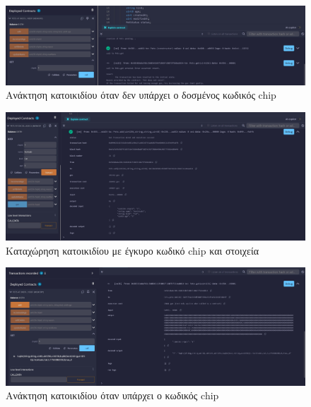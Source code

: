 \documentclass[12pt,a4paper]{article}
\begin{document}
\begin{figure}[ht]
    \centering
    \includegraphics[width=\textwidth]{img/get_fail.jpg}
    \caption{Ανάκτηση κατοικιδίου όταν δεν υπάρχει ο δοσμένος κωδικός chip}
\end{figure}

\begin{figure}[ht]
    \centering
    \includegraphics[width=\textwidth]{img/add_success.jpg}
    \caption{Καταχώρηση κατοικιδίου με έγκυρο κωδικό chip και στοιχεία}
\end{figure}

\begin{figure}[ht]
    \centering
    \includegraphics[width=\textwidth]{img/get_success.jpg}
    \caption{Ανάκτηση κατοικιδίου όταν υπάρχει ο κωδικός chip}
\end{figure}
\end{document}
